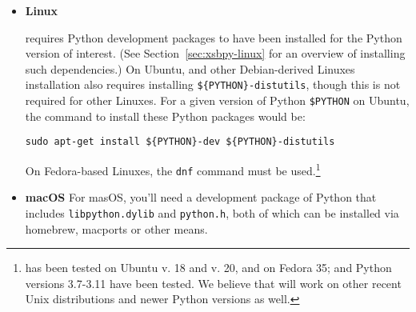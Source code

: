\begin{itemize}
\item {\bf Linux}



\janus{} requires Python development packages to have been installed
for the Python version of interest.  (See
Section~\ref{sec:xsbpy-linux} for an overview of installing such
dependencies.) On Ubuntu, and other Debian-derived Linuxes
installation also requires installing {\tt \$\{PYTHON\}-distutils},
though this is not required for other Linuxes. For a given version of
Python {\tt \$PYTHON} on Ubuntu, the command to install these Python
packages would be:

{\tt sudo apt-get install \$\{PYTHON\}-dev \$\{PYTHON\}-distutils}

On Fedora-based Linuxes, the {\tt dnf} command must be
used.\footnote{\januspy{} has been tested on Ubuntu v. 18 and v. 20,
and on Fedora 35; and Python versions 3.7-3.11 have been tested.  We
believe that \januspy{} will work on other recent Unix distributions
and newer Python versions as well.}



\item {\bf macOS} For masOS, you'll need a development package of
  Python that includes {\tt libpython.dylib} and {\tt python.h}, both
  of which can be installed via homebrew, macports or other means.


  
\end{itemize}

